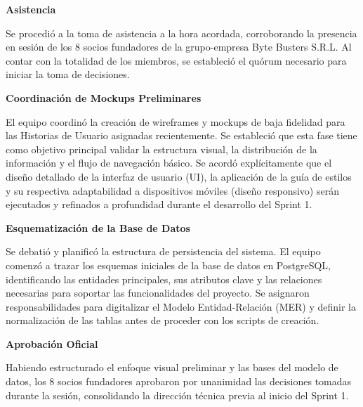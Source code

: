 \noindent \textbf{Asistencia}\par
Se procedió a la toma de asistencia a la hora acordada, corroborando la presencia en sesión de los 8 socios fundadores de la grupo-empresa Byte Busters S.R.L. Al contar con la totalidad de los miembros, se estableció el quórum necesario para iniciar la toma de decisiones.

\vspace*{0.5cm}
\noindent\textbf{Coordinación de Mockups Preliminares}\par
El equipo coordinó la creación de wireframes y mockups de baja fidelidad para las Historias de Usuario asignadas recientemente. Se estableció que esta fase tiene como objetivo principal validar la estructura visual, la distribución de la información y el flujo de navegación básico. Se acordó explícitamente que el diseño detallado de la interfaz de usuario (UI), la aplicación de la guía de estilos y su respectiva adaptabilidad a dispositivos móviles (diseño responsivo) serán ejecutados y refinados a profundidad durante el desarrollo del Sprint 1.

\vspace*{0.5cm}
\noindent \textbf{Esquematización de la Base de Datos}\par
Se debatió y planificó la estructura de persistencia del sistema. El equipo comenzó a trazar los esquemas iniciales de la base de datos en PostgreSQL, identificando las entidades principales, sus atributos clave y las relaciones necesarias para soportar las funcionalidades del proyecto. Se asignaron responsabilidades para digitalizar el Modelo Entidad-Relación (MER) y definir la normalización de las tablas antes de proceder con los scripts de creación.

\vspace*{0.5cm}
\noindent \textbf{Aprobación Oficial}\par
Habiendo estructurado el enfoque visual preliminar y las bases del modelo de datos, los 8 socios fundadores aprobaron por unanimidad las decisiones tomadas durante la sesión, consolidando la dirección técnica previa al inicio del Sprint 1.


